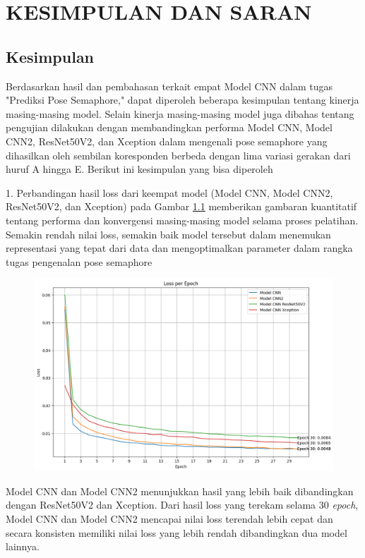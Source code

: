 
\chapter{KESIMPULAN DAN SARAN}

\section{Kesimpulan}
Berdasarkan hasil dan pembahasan terkait empat Model CNN dalam tugas "Prediksi Pose Semaphore," dapat diperoleh beberapa kesimpulan tentang kinerja masing-masing model. Selain kinerja masing-masing model juga dibahas tentang pengujian dilakukan dengan membandingkan performa Model CNN, Model CNN2, ResNet50V2, dan Xception dalam mengenali pose semaphore yang dihasilkan oleh sembilan koresponden berbeda dengan lima variasi gerakan dari huruf A hingga E. Berikut ini kesimpulan yang bisa diperoleh 

1. Perbandingan hasil loss dari keempat model (Model CNN, Model CNN2, ResNet50V2, dan Xception) pada Gambar \ref{fig:GrafikPerbandinganLoss} memberikan gambaran kuantitatif tentang performa dan konvergensi masing-masing model selama proses pelatihan. Semakin rendah nilai loss, semakin baik model tersebut dalam menemukan representasi yang tepat dari data dan mengoptimalkan parameter dalam rangka tugas pengenalan pose semaphore 

\begin{figure}[!hbt]
	\centering
	\includegraphics[width=0.7\linewidth]{gambar/bener/Perbandingan_LossCNN.png}
	\label{fig:GrafikPerbandinganLoss}
\end{figure}

Model CNN dan Model CNN2 menunjukkan hasil yang lebih baik dibandingkan dengan ResNet50V2 dan Xception. Dari hasil loss yang terekam selama 30 \textit{epoch}, Model CNN dan Model CNN2 mencapai nilai loss terendah lebih cepat dan secara konsisten memiliki nilai loss yang lebih rendah dibandingkan dua model lainnya.

